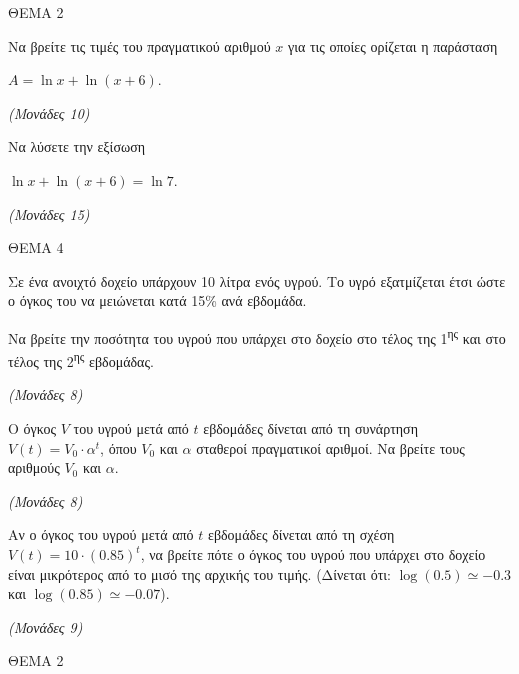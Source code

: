 \documentclass[11pt,a4paper,twoside]{book}
\newcommand{\monades}[1]{\hfill \textit{(Μονάδες #1)}}
\begin{document}
\vspace{4mm}

ΘΕΜΑ 2

\begin{alist}
\item Να βρείτε τις τιμές του πραγματικού αριθμού $x$ για τις οποίες ορίζεται η παράσταση

$A = \ln x + \ln(x + 6)$.

\monades{10}

\item Να λύσετε την εξίσωση

$\ln x + \ln(x + 6) = \ln 7$.

\monades{15}
\end{alist}

\vspace{4mm}

ΘΕΜΑ 4

Σε ένα ανοιχτό δοχείο υπάρχουν 10 λίτρα ενός υγρού. Το υγρό εξατμίζεται έτσι ώστε ο όγκος του να μειώνεται κατά 15\% ανά εβδομάδα.

\begin{alist}
\item Να βρείτε την ποσότητα του υγρού που υπάρχει στο δοχείο στο τέλος της 1\textsuperscript{ης} και στο τέλος της 2\textsuperscript{ης} εβδομάδας.

\monades{8}

\item Ο όγκος $V$ του υγρού μετά από $t$ εβδομάδες δίνεται από τη συνάρτηση $V(t) = V_0 \cdot \alpha^t$, όπου $V_0$ και $\alpha$ σταθεροί πραγματικοί αριθμοί. Να βρείτε τους αριθμούς $V_0$ και $\alpha$.

\monades{8}

\item Αν ο όγκος του υγρού μετά από $t$ εβδομάδες δίνεται από τη σχέση $V(t) = 10 \cdot (0.85)^t$, να βρείτε πότε ο όγκος του υγρού που υπάρχει στο δοχείο είναι μικρότερος από το μισό της αρχικής του τιμής. (Δίνεται ότι: $\log(0.5) \simeq -0.3$ και $\log(0.85) \simeq -0.07$).

\monades{9}
\end{alist}

\vspace{4mm}

ΘΕΜΑ 2
\end{document}
